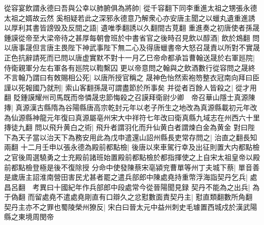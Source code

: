 從容宴飲謂永德曰吾與公幸以肺腑俱為將帥|{
	從千容翻下同李重進太祖之甥張永德太祖之婿故云然}
奚相疑若此之深邪永德意乃解衆心亦安唐主聞之以蠟丸遺重進誘以厚利其書皆謗毁及反間之語|{
	遺唯季翻誘以久翻間古莧翻}
重進奏之初唐使者孫晟鍾謨從帝至大梁帝待之甚厚每朝會班於中書省官之後時召見飲以醇酒|{
	飲於鴆翻}
問以唐事晟但言唐主畏陛下神武事陛下無二心及得唐蠟書帝大怒召晟責以所對不實晟正色抗辭請死而已問以唐虚實默不對十一月乙巳帝命都承旨曹翰送晟於右軍廵院|{
	侍衛親軍分左右軍各有廵院以鞫繫囚}
更以帝意問之翰與之飲酒數行從容問之晟終不言翰乃謂曰有敇賜相公死|{
	以唐所授官稱之}
晟神色怡然索袍笏整衣冠南向拜曰臣謹以死報國乃就刑|{
	索山客翻孫晟可謂盡節於所事矣}
并從者百餘人皆殺之|{
	從才用翻}
貶鍾謨耀州司馬既而帝憐晟忠節悔殺之召謨拜衛尉少卿　帝召華山隱士真源陳摶|{
	真源漢古縣隋為谷陽縣唐高宗乾封元年以老子所生之地改為真源縣載初元年改為仙源縣神龍元年復曰真源屬亳州宋大中祥符七年改曰衛真縣九域志在州西六十里摶徒九翻}
問以飛升黄白之術|{
	飛升者謂羽化而升仙黄白者謂煉白金為黄金}
對曰陛下為天子當以治天下為務安用此為戊申遣還山詔州縣長吏常存問之|{
	治直之翻長知兩翻}
十二月壬申以張永德為殿前都點檢|{
	後唐以來車駕行幸及出征則置大内都點檢之官後周選驍勇之士充殿前諸班始置殿前都點檢於都指揮使之上自宋太祖皇帝以殿前都點檢登極是後不復除授}
分命中使發陳蔡宋亳潁兖曹單等州丁夫城下蔡|{
	單音善}
是歲唐主詔淮南營田害民尤甚者罷之遣兵部郎中陳處堯持重幣浮海詣契丹乞兵|{
	處昌呂翻　考異曰十國紀年作兵部郎中段處常今從晉陽聞見録}
契丹不能為之出兵|{
	為于偽翻}
而留處堯不遣處堯剛直有口辯久之忿懟數面責契丹主|{
	懟直類翻數所角翻}
契丹主亦不之罪也蜀陵榮州獠反|{
	宋白曰晉太元中益州刺史毛璩置西城戍於漢武陽縣之東境周閔帝}


